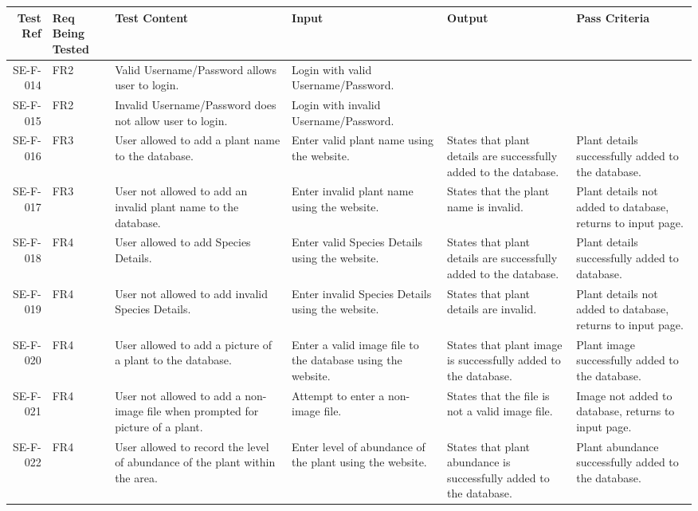 	\begin{landscape}
		\begin{longtable}{|r|l|p{4cm}|p{4cm}|p{4cm}|p{4cm}|}
		\hline
		Test Ref & Req Being Tested & Test Content & Input & Output & Pass Criteria \\ \hline
		SE-F-014 & FR2 & Valid Username/Password allows user to login. & Login with valid Username/Password. & & \\ \hline
		SE-F-015 & FR2 & Invalid Username/Password does not allow user to login. & Login with invalid Username/Password. & & \\ \hline
		SE-F-016 & FR3 & User allowed to add a plant name to the database. & Enter valid plant name using the website. & States that plant details are successfully added to the database. & Plant details successfully added to the database. \\ \hline
		SE-F-017 & FR3 & User not allowed to add an invalid plant name to the database. & Enter invalid plant name using the website. & States that the plant name is invalid. & Plant details not added to database, returns to input page. \\ \hline
		SE-F-018 & FR4 & User allowed to add Species Details. & Enter valid Species Details using the website. & States that plant details are successfully added to the database. & Plant details successfully added to database. \\ \hline
		SE-F-019 & FR4 & User not allowed to add invalid Species Details. & Enter invalid Species Details using the website. & States that plant details are invalid. & Plant details not added to database, returns to input page. \\ \hline
		SE-F-020 & FR4 & User allowed to add a picture of a plant to the database. & Enter a valid image file to the database using the website. & States that plant image is successfully added to the database. & Plant image successfully added to the database. \\ \hline
		SE-F-021 & FR4 & User not allowed to add a non-image file when prompted for picture of a plant.& Attempt to enter a non-image file. & States that the file is not a valid image file. & Image not added to database, returns to input page. \\ \hline
		SE-F-022 & FR4 & User allowed to record the level of abundance of the plant within the area. & Enter level of abundance of the plant using the website. & States that plant abundance is successfully added to the database. & Plant abundance successfully added to the database. \\ \hline

\end{longtable}
\end{landscape}
